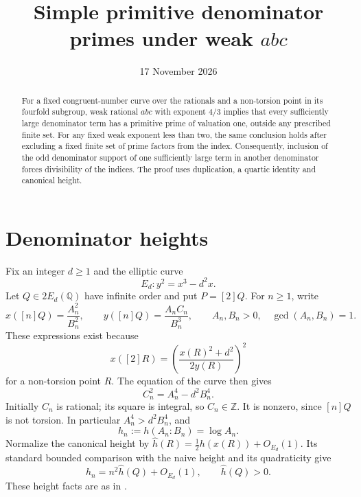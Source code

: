 \documentclass[11pt,a4paper]{article}
\title{Simple primitive denominator primes under weak \texorpdfstring{$abc$}{abc}}
\author{}\date{17 November 2026}
\newcommand{\Q}{\mathbb Q}\newcommand{\Z}{\mathbb Z}
\begin{document}
\maketitle

\begin{abstract}
For a fixed congruent-number curve over the rationals and a non-torsion
point in its fourfold subgroup, weak rational $abc$ with exponent $4/3$
implies that every sufficiently large denominator term has a primitive
prime of valuation one, outside any prescribed finite set.
For any fixed weak exponent less than two, the same conclusion
holds after excluding a fixed finite set of prime factors from the index.
Consequently, inclusion of the odd denominator support of one sufficiently
large term in another denominator forces divisibility of the indices.
The proof uses duplication, a quartic identity and canonical height.
\end{abstract}

\section{Denominator heights}

Fix an integer $d\ge1$ and the elliptic curve
\[
                       E_d:y^2=x^3-d^2x.
\]
Let $Q\in2E_d(\Q)$ have infinite order and put $P=[2]Q$.
For $n\ge1$, write
\begin{equation}\label{eq:coordinates}
 x([n]Q)=\frac{A_n^2}{B_n^2},\qquad
 y([n]Q)=\frac{A_n C_n}{B_n^3},\qquad
 A_n,B_n>0,\quad\gcd(A_n,B_n)=1.
\end{equation}
These expressions exist because
\[
 x([2]R)=\left(\frac{x(R)^2+d^2}{2y(R)}\right)^2
\]
for a non-torsion point $R$. The equation of the curve then gives
\begin{equation}\label{eq:quartic}
                         C_n^2=A_n^4-d^2B_n^4.
\end{equation}
Initially $C_n$ is rational; its square is integral, so $C_n\in\Z$.
It is nonzero, since $[n]Q$ is not torsion. In particular
$A_n^4>d^2B_n^4$, and
\[
                  h_n:=h(A_n:B_n)=\log A_n.
\]
Normalize the canonical height by
$\widehat h(R)=\tfrac12h(x(R))+O_{E_d}(1)$. Its standard bounded
comparison with the naive height and its quadraticity give
\begin{equation}\label{eq:canonical}
              h_n=n^2\widehat h(Q)+O_{E_d}(1),\qquad
                         \widehat h(Q)>0.
\end{equation}
These height facts are as in \cite[Chapter VIII, Section 9]{AEC}.
\end{document}
